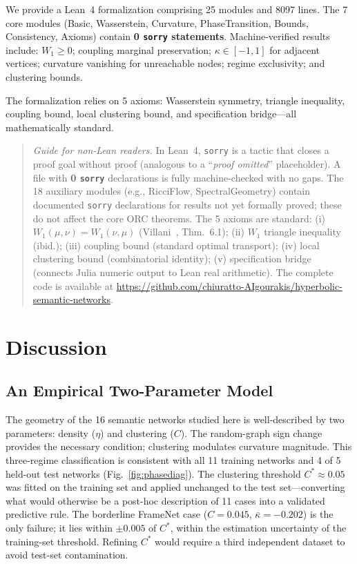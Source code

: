 \documentclass[11pt,a4paper]{article}
\newcommand{\kbar}{\bar{\kappa}}
\newcommand{\Cstar}{C^*}
\begin{document}
We provide a Lean~4 formalization comprising 25 modules and 8097 lines. The 7 core modules (Basic, Wasserstein, Curvature, PhaseTransition, Bounds, Consistency, Axioms) contain \textbf{0 \texttt{sorry} statements}. Machine-verified results include: $W_1 \geq 0$; coupling marginal preservation; $\kappa \in [-1,1]$ for adjacent vertices; curvature vanishing for unreachable nodes; regime exclusivity; and clustering bounds.

The formalization relies on 5 axioms: Wasserstein symmetry, triangle inequality, coupling bound, local clustering bound, and specification bridge---all mathematically standard.

\begin{quote}
\small\textit{Guide for non-Lean readers.} In Lean~4, \texttt{sorry} is a tactic that closes a proof goal without proof (analogous to a ``\textit{proof omitted}'' placeholder). A file with \textbf{0 \texttt{sorry}} declarations is fully machine-checked with no gaps. The 18 auxiliary modules (e.g., RicciFlow, SpectralGeometry) contain documented \texttt{sorry} declarations for results not yet formally proved; these do not affect the core ORC theorems. The 5 axioms are standard: (i) $W_1(\mu,\nu)=W_1(\nu,\mu)$ (Villani~\cite{villani2009optimal}, Thm.\ 6.1); (ii) $W_1$ triangle inequality (ibid.); (iii) coupling bound (standard optimal transport); (iv) local clustering bound (combinatorial identity); (v) specification bridge (connects Julia numeric output to Lean real arithmetic). The complete code is available at \url{https://github.com/chiuratto-AIgourakis/hyperbolic-semantic-networks}.
\end{quote}


\section{Discussion}
\label{sec:discussion}

\subsection{An Empirical Two-Parameter Model}

The geometry of the 16 semantic networks studied here is well-described by two parameters: density ($\eta$) and clustering ($C$). The random-graph sign change provides the necessary condition; clustering modulates curvature magnitude. This three-regime classification is consistent with all 11 training networks and 4 of 5 held-out test networks (Fig.~\ref{fig:phasediag}). The clustering threshold $\Cstar \approx 0.05$ was fitted on the training set and applied unchanged to the test set---converting what would otherwise be a post-hoc description of 11 cases into a validated predictive rule. The borderline FrameNet case ($C=0.045$, $\kbar=-0.202$) is the only failure; it lies within $\pm 0.005$ of $\Cstar$, within the estimation uncertainty of the training-set threshold. Refining $\Cstar$ would require a third independent dataset to avoid test-set contamination.
\end{document}
